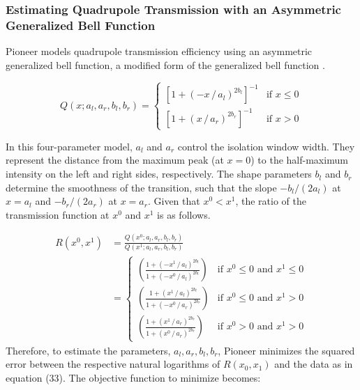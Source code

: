 \documentclass[pdflatex,sn-nature]{sn-jnl}
\begin{document}
\subsubsection{Estimating Quadrupole Transmission with an Asymmetric Generalized Bell Function}\label{subsubsec:asymmetric-generalized-bell-function}
Pioneer models quadrupole transmission efficiency using an asymmetric generalized bell function, a modified form of the generalized bell function \cite{Jang1993-ke}. 

\begin{equation}
    Q(x; a_l, a_r, b_l, b_r) = \begin{cases}
    \left[1 + \left(-x \,/\, a_l\right)^{2b_l}\right]^{-1} & \text{if } x \leq 0 \\
    \left[1 + \left(x \,/\, a_r\right)^{2b_r}\right]^{-1} & \text{if } x > 0
    \end{cases}
\end{equation}

In this four-parameter model, $a_l$ and $a_r$ control the isolation window width. They represent the distance from the maximum peak (at $x=0$) to the half-maximum intensity on the left and right sides, respectively. The shape parameters $b_l$ and $b_r$ determine the smoothness of the transition, such that the slope $-b_l/(2a_l)$ at $x = a_l$ and $-b_r/(2a_r)$ at $x = a_r$. Given that $x^0 < x^1$, the ratio of the transmission function at $x^0$ and $x^1$ is as follows. 

\begin{equation}
    \begin{aligned}
    R(x^0, x^1) &= \frac{Q(x^0; a_l, a_r, b_l, b_r)}{Q(x^1; a_l, a_r, b_l, b_r)} \\[1em]
    &= \begin{cases}
    \left(\frac{1 + \left(-x^1 \,/\, a_l \right)^{2b_l}}{1 + \left(-x^0 \,/\, a_l \right)^{2b_l}}\right) & \text{if } x^0 \leq 0 \text{ and } x^1 \leq 0 \\[1em]
    \left(\frac{1 + \left(x^1 \,/\, a_l \right)^{2b_l}}{1 + \left(-x^0 \,/\, a_r \right)^{2b_r}}\right) & \text{if } x^0 \leq 0 \text{ and } x^1 > 0 \\[1em]
    \left(\frac{1 + \left(x^1 \,/\, a_r \right)^{2b_r}}{1 + \left(x^0 \,/\, a_r \right)^{2b_r}}\right) & \text{if } x^0 > 0 \text{ and } x^1 > 0
    \end{cases}
    \end{aligned}
\end{equation}
Therefore, to estimate the parameters, $ a_l, a_r, b_l, b_r$, Pioneer minimizes the squared error between the respective natural logarithms of $R(x_0, x_1)$ and the data as in equation (33). The objective function to minimize becomes:
\end{document}
